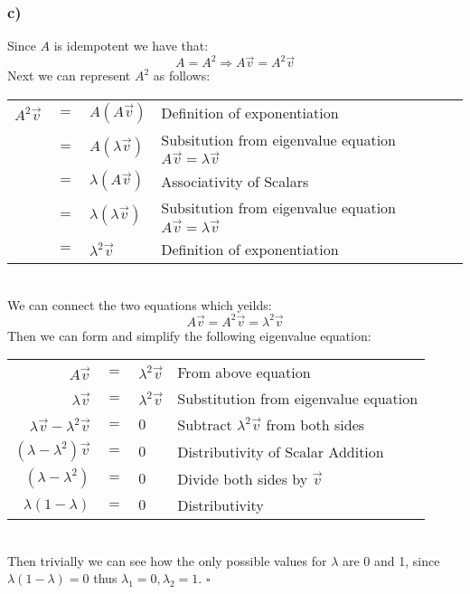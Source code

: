 \documentclass{article}
\begin{document}
\subsubsection*{c)}
Since $A$ is idempotent we have that: $$A=A^{2}\Rightarrow A\vec{v}=A^{2}\vec{v}$$
Next we can represent $A^{2}$ as follows: 
\begin{table}[htp]
\centering
\begin{tabular}{ccll}
  $A^{2}\vec{v}$ & $=$ &  $A(A\vec{v})$ & Definition of exponentiation  \\
                 & $=$ &  $A(\lambda \vec{v})$ & Subsitution from eigenvalue equation $A\vec{v}=\lambda\vec{v}$  \\
                 & $=$ &  $\lambda(A\vec{v})$  & Associativity of Scalars  \\
                 & $=$ &  $\lambda(\lambda\vec{v})$ &   Subsitution from eigenvalue equation $A\vec{v}=\lambda\vec{v}$\\
                 & $=$ &  $\lambda^{2}\vec{v}$ &  Definition of exponentiation\\
\end{tabular}
\end{table}\\
We can connect the two equations which yeilds: $$A\vec{v}=A^{2}\vec{v}=\lambda^{2}\vec{v}$$
Then we can form and simplify the following eigenvalue equation: 
\begin{table}[htp]
\centering
\begin{tabular}{rcll}
 $A\vec{v}$        & $=$ & $\lambda^{2}\vec{v}$ & From above equation  \\
 $\lambda \vec{v}$ & $=$ & $\lambda^{2} \vec{v}$  & Substitution from eigenvalue equation  \\
 $\lambda \vec{v} - \lambda^{2} \vec{v}$            & $=$ & $0$  &  Subtract $\lambda^{2}\vec{v}$ from both sides\\
 $(\lambda  - \lambda^{2}) \vec{v}$            & $=$ & $0$  &  Distributivity of Scalar Addition \\
 $(\lambda  - \lambda^{2})$            & $=$ & $0$  &  Divide both sides by $\vec{v}$ \\
 $\lambda(1  - \lambda)$            & $=$ & $0$  &  Distributivity \\
\end{tabular}
\end{table}\\
Then trivially we can see how the only possible values for $\lambda$ are 0 and 1, since $\lambda(1-\lambda)=0$ thus $\lambda_{1}=0, \lambda_{2}=1$. $\square$
\end{document}

